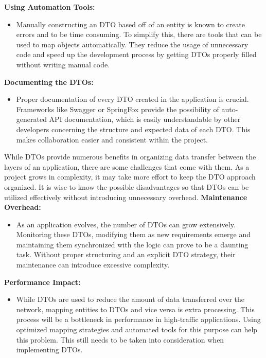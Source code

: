    \textbf{Using Automation Tools:}
        \begin{itemize}
            \item Manually constructing an DTO based off of an entity is known to create errors and to be time consuming. To simplify this, there are tools that can be used to map objects automatically. They reduce the usage of unnecessary code and speed up the development process by getting DTOs properly filled without writing manual code.
        \end{itemize}
    \textbf{Documenting the DTOs:}
        \begin{itemize}
            \item Proper documentation of every DTO created in the application is crucial. Frameworks like Swagger or SpringFox provide the possibility of auto-generated API documentation, which is easily understandable by other developers concerning the structure and expected data of each DTO. This makes collaboration easier and consistent within the project. 
        \end{itemize} 
    While DTOs provide numerous benefits in organizing data transfer between the layers of an application, there are some challenges that come with them. As a project grows in complexity, it may take more effort to keep the DTO approach organized. It is wise to know the possible disadvantages so that DTOs can be utilized effectively without introducing unnecessary overhead. \newline \newline
    \textbf{Maintenance Overhead:}
    \begin{itemize}
        \item As an application evolves, the number of DTOs can grow extensively. Monitoring these DTOs, modifying them as new requirements emerge and maintaining them synchronized with the logic can prove to be a daunting task. Without proper structuring and an explicit DTO strategy, their maintenance can introduce excessive complexity.
    \end{itemize}
    \textbf{Performance Impact:}
    \begin{itemize}
        \item While DTOs are used to reduce the amount of data transferred over the network, mapping entities to DTOs and vice versa is extra processing. This process will be a bottleneck in performance in high-traffic applications. Using optimized mapping strategies and automated tools for this purpose can help this problem. This still needs to be taken into consideration when implementing DTOs.\newpage
    \end{itemize}

